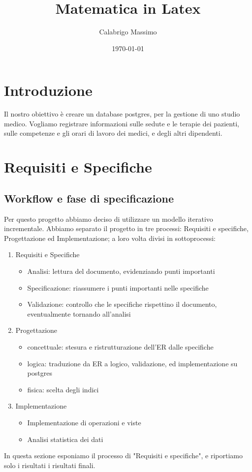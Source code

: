 \documentclass[11pt]{article}
\begin{document}
\title{Matematica in Latex}
\author{Calabrigo Massimo}
\date{\today}
\maketitle

\tableofcontents
\section{Introduzione}
Il nostro obiettivo è creare un database postgres, per la gestione di uno studio medico.
Vogliamo registrare informazioni sulle sedute e le terapie dei pazienti, sulle competenze e gli orari di lavoro dei medici, e degli altri dipendenti.
\section{Requisiti e Specifiche}

\subsection{Workflow e fase di specificazione}
Per questo progetto abbiamo deciso di utilizzare un modello iterativo incrementale.
Abbiamo separato il progetto in tre processi: Requisiti e specifiche, Progettazione ed Implementazione;
a loro volta divisi in sottoprocessi:
\begin{enumerate}
    \item Requisiti e Specifiche
    \begin{itemize}
        \item Analisi: lettura del documento, evidenziando punti importanti
        \item Specificazione: riassumere i punti importanti nelle specifiche
        \item Validazione: controllo che le specifiche rispettino il documento, eventualmente tornando all'analisi
    \end{itemize}
    \item Progettazione
    \begin{itemize}
        \item concettuale: stesura e ristrutturazione dell'ER dalle specifiche
        \item logica: traduzione da ER a logico, validazione, ed implementazione su postgres
        \item fisica: scelta degli indici
    \end{itemize}
    \item Implementazione
    \begin{itemize}
        \item Implementazione di operazioni e viste
        \item Analisi statistica dei dati
    \end{itemize}
\end{enumerate}
In questa sezione esponiamo il processo di "Requisiti e specifiche", e riportiamo
solo i risultati i risultati finali.
\end{document}
